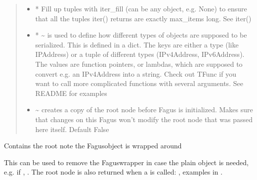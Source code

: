\documentclass[a4paper,10pt,english]{sphinxmanual}
\begin{document}
\begin{fulllineitems}
\begin{fulllineitems}
\begin{quote}
\begin{description}
\begin{itemize}
\item {}
\sphinxAtStartPar
{} \textendash{} * Fill up tuples with iter\_fill (can be any object, e.g. None) to ensure that all the tuples
iter() returns are exactly max\_items long. See iter()

\item {}
\sphinxAtStartPar
{} \textendash{} * \textasciitilde{} is used to define how different types of objects are supposed to be serialized. This is
defined in a dict. The keys are either a type (like IPAddress) or a tuple of different types
(IPv4Address, IPv6Address). The values are function pointers, or lambdas, which are supposed to convert
e.g. an IPv4Address into a string. Check out TFunc if you want to call more complicated functions with
several arguments. See README for examples

\item {}
\sphinxAtStartPar
{} \textendash{} \textasciitilde{} creates a copy of the root node before Fagus is initialized. Makes sure that changes on this Fagus
won’t modify the root node that was passed here itself. Default False

\end{itemize}

\end{description}\end{quote}

\end{fulllineitems}


\begin{fulllineitems}
\label{\detokenize{fagus:fagus.Fagus.root}}
\pysigstartsignatures
{}
\pysigstopsignatures
\sphinxAtStartPar
Contains the root note the Fagus\sphinxhyphen{}object is wrapped around

\sphinxAtStartPar
This can be used to remove the Fagus\sphinxhyphen{}wrapper in case the plain object is needed, e.g. if ,
. The root node is also returned when a is called: , examples in .


\end{fulllineitems}
\end{fulllineitems}
\end{document}
